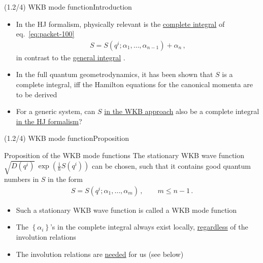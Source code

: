\documentclass[mathserif]{beamer}
\newcommand{\cbr}[1]{{\left\{#1\right\}}}
\newcommand{\rfun}[2]{#1\mathopen{}\left(#2\right)\mathclose{}}
\newcommand\mi{\mathrm{i}} %
\begin{document}
\begin{frame}{(1.2/4) WKB mode function}{Introduction}
\begin{itemize}
    \item In the HJ formalism, physically relevant is the \underline{complete integral} of eq.\ \eqref{eq:packet-100}
\begin{align}
    S = \rfun{S}{q^i; \alpha_1, \ldots, \alpha_{n-1}} + \alpha_n\,,
    \label{eq:packet-150}
\end{align}
    in contrast to the \underline{general integral} .
    
    \item
    In the full quantum geometrodynamics, it has been shown that $S$ is a complete integral, iff the Hamilton equations for the canonical momenta are to be derived 
    
    \item
    For a generic system, can $S$ \underline{in the WKB approach} also be a \alert{complete integral} \underline{in the HJ formalism}?
\end{itemize}
\end{frame}

\begin{frame}{(1.2/4) WKB mode function}{Proposition}
\begin{alertblock}{Proposition of the WKB mode functions}
    The stationary WKB wave function $\sqrt{\rfun{D}{q^i}}\,
    \rfun{\exp}{\frac{\mi}{\hslash} \rfun{S}{q^i}}$ can be chosen, such that it contains good quantum numbers in $S$ in the form
    \begin{align}
    S = \rfun{S}{q^i; \alpha_1, \ldots, \alpha_{m}}\,, \qquad m \le n-1\,.
\end{align}
\end{alertblock}
\begin{itemize}
    \item Such a stationary WKB wave function is called a \alert{WKB mode function}
    \item The $\cbr{\alpha_i}$'s in the complete integral always exist locally, \underline{regardless} of the involution relations
    \item The involution relations are \underline{needed} for us (see below)
\end{itemize}
\end{frame}
\end{document}
